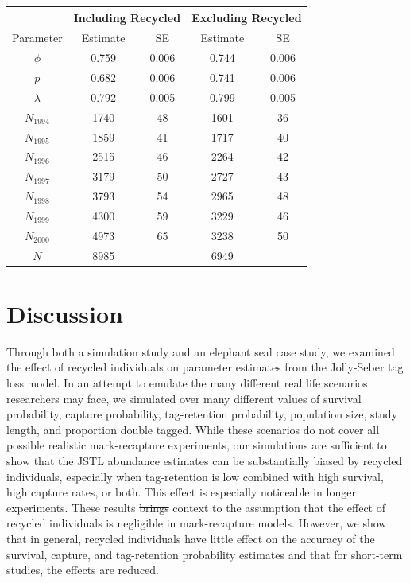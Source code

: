 \documentclass[12pt]{article}
\providecommand{\DIFaddtex}[1]{{\protect\color{blue}\uwave{#1}}} %
\providecommand{\DIFdeltex}[1]{{\protect\color{red}\sout{#1}}}                      %
\providecommand{\DIFaddbegin}{} %
\providecommand{\DIFaddend}{} %
\providecommand{\DIFdelbegin}{} %
\providecommand{\DIFdelend}{} %
\providecommand{\DIFadd}[1]{\texorpdfstring{\DIFaddtex{#1}}{#1}} %
\providecommand{\DIFdel}[1]{\texorpdfstring{\DIFdeltex{#1}}{}} %
\newcommand{\DIFscaledelfig}{0.5}
\newlength{\DIFdelgraphicswidth} %
\newlength{\DIFdelgraphicsheight} %
\newcommand{\DIFaddincludegraphics}[2][]{{\color{blue}\fbox{\DIFOincludegraphics[#1]{#2}}}} %
\newcommand{\DIFdelincludegraphics}[2][]{%
\sbox{\DIFdelgraphicsbox}{\DIFOincludegraphics[#1]{#2}}%
\settoboxwidth{\DIFdelgraphicswidth}{\DIFdelgraphicsbox} %
\settoboxtotalheight{\DIFdelgraphicsheight}{\DIFdelgraphicsbox} %
\scalebox{\DIFscaledelfig}{%
\parbox[b]{\DIFdelgraphicswidth}{\usebox{\DIFdelgraphicsbox}\\[-\baselineskip] \rule{\DIFdelgraphicswidth}{0em}}\llap{\resizebox{\DIFdelgraphicswidth}{\DIFdelgraphicsheight}{%
\setlength{\unitlength}{\DIFdelgraphicswidth}%
\begin{picture}(1,1)%
\thicklines\linethickness{2pt} %
{\color[rgb]{1,0,0}\put(0,0){\framebox(1,1){}}}%
{\color[rgb]{1,0,0}\put(0,0){\line( 1,1){1}}}%
{\color[rgb]{1,0,0}\put(0,1){\line(1,-1){1}}}%
\end{picture}%
}\hspace*{3pt}}} %
} %
\DeclareRobustCommand{\DIFaddbegin}{\DIFOaddbegin \let\includegraphics\DIFaddincludegraphics} %
\DeclareRobustCommand{\DIFaddend}{\DIFOaddend \let\includegraphics\DIFOincludegraphics} %
\DeclareRobustCommand{\DIFdelbegin}{\DIFOdelbegin \let\includegraphics\DIFdelincludegraphics} %
\DeclareRobustCommand{\DIFdelend}{\DIFOaddend \let\includegraphics\DIFOincludegraphics} %
\begin{document}
\begin{center}
\begin{tabular}{c c c c c}
& \multicolumn{2}{l}{Including Recycled} & \multicolumn{2}{l}{Excluding Recycled} \\ \hline
Parameter & Estimate & SE & Estimate & SE \\ \hline
$\phi$ & 0.759 & 0.006 & 0.744 & 0.006\\
$p$ & 0.682 & 0.006 & 0.741 & 0.006 \\
$\lambda $ & 0.792 & 0.005 & 0.799 & 0.005\\ \hline
$N_{1994}$ & 1740 & 48 & 1601 & 36 \\
$N_{1995}$ & 1859 & 41 & 1717 & 40 \\
$N_{1996}$ & 2515 & 46 & 2264 & 42 \\
$N_{1997}$ & 3179 & 50 & 2727 & 43 \\
$N_{1998}$ & 3793 & 54 & 2965 & 48 \\
$N_{1999}$ & 4300 & 59 & 3229 & 46 \\
$N_{2000}$ & 4973 & 65 & 3238 & 50 \\ \hline
$N$ & 8985 & & 6949 &  \\ \hline
\end{tabular}
\end{center}

\section{Discussion}\label{discussion}
Through both a simulation study and an elephant seal case study, we examined the effect of recycled individuals on parameter estimates from the Jolly-Seber tag loss model. In an attempt to emulate the many different real life scenarios researchers may face, we simulated over many different values of survival probability, capture probability, tag-retention probability, population size, study length, and proportion double tagged. While these scenarios do not cover all possible realistic mark-recapture experiments, our simulations are sufficient to show that the JSTL abundance estimates can be substantially biased by recycled individuals, especially when tag-retention is low combined with high survival, high capture rates, or both. This effect is especially noticeable in longer experiments. These results \DIFdelbegin \DIFdel{brings }\DIFdelend \DIFaddbegin \DIFadd{bring }\DIFaddend context to the assumption that the effect of recycled individuals is negligible in mark-recapture models. However, we show that in general, recycled individuals have little effect on the accuracy of the survival, capture, and tag-retention probability
estimates and that for short-term studies, the effects are reduced.
\end{document}
